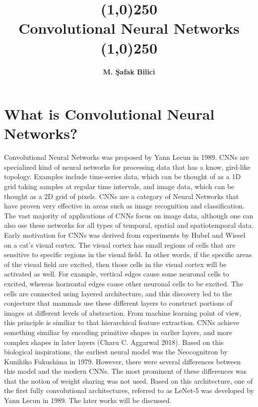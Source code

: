 \documentclass[11pt]{article}
\date{}
\begin{document}
\title{\line(1,0){250} \\ \huge{\textbf{Convolutional Neural Networks}} \\\line(1,0){250}}
\author{\textbf{M. Şafak Bilici}}
\maketitle

\tableofcontents

\section{What is Convolutional Neural Networks?}
\hspace*{1cm} Convolutional Neural Networks was proposed by Yann Lecun in 1989. CNNs are specialized kind of neural networks for processing data that has a know, gird-like topology. Examples include time-series data, which can be thought of as a 1D grid taking samples at regular time intervals, and image data, which can be thought as a 2D grid of pixels. CNNs are a category of Neural Networks that have proven very effective in areas such as image recognition and classification. The vast majority of applications of CNNs focus on image data, although one can also ose these networks for all types of temporal, spatial and spatiotemporal data.\cite{GoodBengCour16}\\
Early motivation for CNNs was derived from experiments by Hubel and Wiesel on a cat's visual cortex. The visual cortex has small regions of cells that are sensitive to specific regions in the visual field. In other words, if the specific areas of the visual field are excited, then those cells in the visual cortex will be activated as well. For example, vertical edges cause some neuronal cells to excited, whereas horizontal edges cause other neuronal cells to be excited. The cells are connected using layered architecture, and this discovery led to the conjecture that mammals use these different layers to construct portions of images at different levels of abstraction. From machine learning point of view, this principle is similiar to that hierarchical feature extraction. CNNs achieve something similiar by encoding primitive shapes in earlier layers, and more complex shapes in later layers (Charu C. Aggarwal 2018).
Based on this biological inspirations, the earliest neural model was the Neocognitron by Kunihiko Fukushima in 1979. However, there were several differences between this model and the modern CNNs. The most prominent of these differences was that the notion of weight sharing was not used. Based on this architecture, one of the first fully convolutional architectures, referred to as LeNet-5 was developed by Yann Lecun in 1989. The later works will be discussed. 
\end{document}
